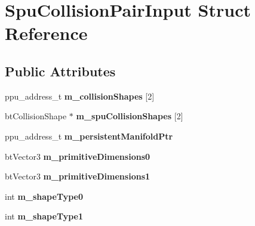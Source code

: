 \hypertarget{structSpuCollisionPairInput}{}\section{Spu\+Collision\+Pair\+Input Struct Reference}
\label{structSpuCollisionPairInput}
\subsection*{Public Attributes}
\begin{DoxyCompactItemize}
\item 
\mbox{\label{structSpuCollisionPairInput_a99be20b92bd151d62c6de5dba7702073}} 
ppu\+\_\+address\+\_\+t {\bfseries m\+\_\+collision\+Shapes} \mbox{[}2\mbox{]}
\item 
\mbox{\label{structSpuCollisionPairInput_a25e3e2a87f0062a63cd708c1937a68ff}} 
bt\+Collision\+Shape $\ast$ {\bfseries m\+\_\+spu\+Collision\+Shapes} \mbox{[}2\mbox{]}
\item 
\mbox{\label{structSpuCollisionPairInput_a034646c4c1a2584541f58168ddc4a29f}} 
ppu\+\_\+address\+\_\+t {\bfseries m\+\_\+persistent\+Manifold\+Ptr}
\item 
\mbox{\label{structSpuCollisionPairInput_a0e22c42e55754830e618822f30cc4864}} 
bt\+Vector3 {\bfseries m\+\_\+primitive\+Dimensions0}
\item 
\mbox{\label{structSpuCollisionPairInput_a55768b4d39fdf2c284dc81916a0ad91b}} 
bt\+Vector3 {\bfseries m\+\_\+primitive\+Dimensions1}
\item 
\mbox{\label{structSpuCollisionPairInput_a27ee106768e33bbeb8287412958f4502}} 
int {\bfseries m\+\_\+shape\+Type0}
\item 
\mbox{\label{structSpuCollisionPairInput_aaedd38dc580e477dde7cff180ea9a9ff}} 
int {\bfseries m\+\_\+shape\+Type1}
\item 
\mbox{\label{structSpuCollisionPairInput_a7d21c1887cdb71a526d7ea79759ded7d}} 

\end{DoxyCompactItemize}
